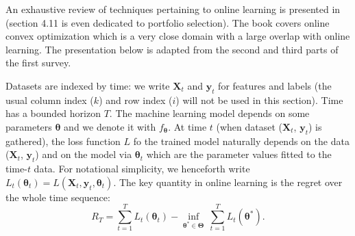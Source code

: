 \documentclass[]{krantz}
\theoremstyle{definition}
\theoremstyle{definition}
\theoremstyle{definition}
\theoremstyle{remark}
\begin{document}
An exhaustive review of techniques pertaining to online learning is
presented in \citet{hoi2018online} (section 4.11 is even dedicated to
portfolio selection). The book \citet{hazan2016introduction} covers
online convex optimization which is a very close domain with a large
overlap with online learning. The presentation below is adapted from the
second and third parts of the first survey.

Datasets are indexed by time: we write \(\textbf{X}_t\) and
\(\textbf{y}_t\) for features and labels (the usual column index (\(k\))
and row index (\(i\)) will not be used in this section). Time has a
bounded horizon \(T\). The machine learning model depends on some
parameters \(\boldsymbol{\theta}\) and we denote it with
\(f_{\boldsymbol{\theta}}\). At time \(t\) (when dataset
(\(\textbf{X}_t\), \(\textbf{y}_t\)) is gathered), the loss function
\(L\) fo the trained model naturally depends on the data
(\(\textbf{X}_t\), \(\textbf{y}_t\)) and on the model via
\(\boldsymbol{\theta}_t\) which are the parameter values fitted to the
time-\(t\) data. For notational simplicity, we henceforth write
\(L_t(\boldsymbol{\theta}_t)=L(\textbf{X}_t,\textbf{y}_t,\boldsymbol{\theta}_t )\).
The key quantity in online learning is the regret over the whole time
sequence: \begin{equation}
\label{eq:regret} 
R_T=\sum_{t=1}^TL_t(\boldsymbol{\theta}_t)-\underset{\boldsymbol{\theta}^*\in \boldsymbol{\Theta}}{\inf} \ \sum_{t=1}^TL_t(\boldsymbol{\theta}^*).
\end{equation}
\end{document}
